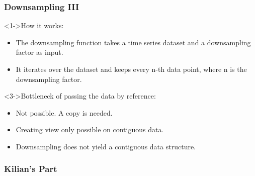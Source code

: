 \documentclass[t,english]{beamer}
\begin{document}
\begin{frame}
  \frametitle{Downsampling III}
    \begin{block}<1->{How it works:}
      \begin{itemize}
        \item<1-> The downsampling function takes a time series dataset and a downsampling factor as input.
        \item<2-> It iterates over the dataset and keeps every n-th data point, where n is the downsampling factor.
      \end{itemize}
    \end{block}

    \begin{block}<3->{Bottleneck of passing the data by reference:}
      \begin{itemize}
        \item<3-> Not possible. A copy is needed.
        \item <4-> Creating view only possible on contiguous data.
        \item <5-> Downsampling does not yield a contiguous data structure.
      \end{itemize}
    \end{block}
\end{frame}

\begin{frame}
  \frametitle{Kilian's Part}
    
\end{frame}
\end{document}
